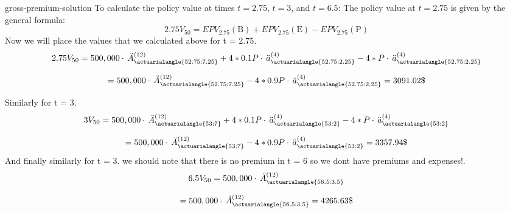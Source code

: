 \begin{solve}{}{gross-premium-solution}
		To calculate the policy value at times \(t = 2.75\), \(t = 3\), and \(t = 6.5\):
		The policy value at  \(t = 2.75 \) is given by the general formula:
		\[
		2.75V_{50} = EPV_{2.75}(\text{B}) + EPV_{2.75}(\text{E}) -  EPV_{2.75}(\text{P})
		\]
		Now we will place the values that we calculated above for t = 2.75.
		\[
		2.75V_{50} = 500,000 \cdot \,  \ddot{A}_{\actuarialangle{52.75:7.25}}^{(12)} + 4 * 0.1P \cdot \, \ddot{a}_{\actuarialangle{52.75:2.25}}^{(4)} - 4 * P \cdot \, \ddot{a}_{\actuarialangle{52.75:2.25}}^{(4)}
		\]
		
		$$= 
		500,000 \cdot \,  \ddot{A}_{\actuarialangle{52.75:7.25}}^{(12)} - 4 * 0.9P \cdot \, \ddot{a}_{\actuarialangle{52.75:2.25}}^{(4)} = 3091.02\$ $$
		
	
		Similarly for t = 3.
		\[
		3V_{50} = 500,000 \cdot \,  \ddot{A}_{\actuarialangle{53:7}}^{(12)} + 4 * 0.1P \cdot \, \ddot{a}_{\actuarialangle{53:2}}^{(4)} - 4 * P \cdot \, \ddot{a}_{\actuarialangle{53:2}}^{(4)}
		\]
		
		$$= 
		500,000 \cdot \,  \ddot{A}_{\actuarialangle{53:7}}^{(12)} - 4 * 0.9P \cdot \, \ddot{a}_{\actuarialangle{53:2}}^{(4)} = 3357.94\$ $$
		And finally similarly for t = 3.
		we should note that there is no premium in t = 6 so we dont have premiums and expenses!.
		\[
		6.5V_{50} = 500,000 \cdot \,  \ddot{A}_{\actuarialangle{56.5:3.5}}^{(12)} 
		\]
		
		$$= 
		500,000 \cdot \,  \ddot{A}_{\actuarialangle{56.5:3.5}}^{(12)} = 4265.63\$ $$
		
	
		
	\end{solve}
	
	\vspace{2ex}
	
	
	
%	
%	
%	

